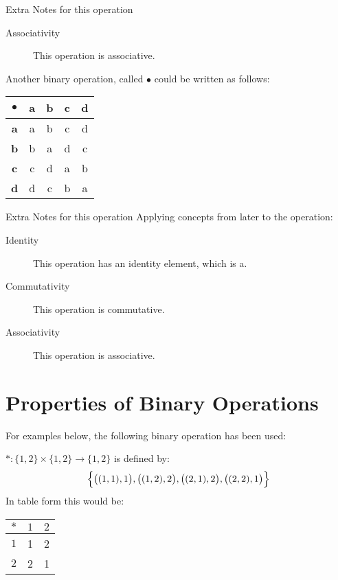 \documentclass[../notes.tex]{subfiles}
\begin{document}
\begin{examplebox}
\begin{center}
\begin{notebox}{Extra Notes for this operation}
\begin{description}
							\item[Associativity] This operation is associative.
						\end{description}
					\end{notebox}
					\end{center}
					Another binary operation, called $\bullet$ could be written as follows:
					\begin{center}
						\begin{tabular}{|c|c c c c|}
							\hline
							\textbf{$\bullet$} & \textbf{a} & \textbf{b} & \textbf{c} & \textbf{d}\\
							\hline
							\textbf{a} & a & b & c & d \\
							\textbf{b} & b & a & d & c \\
							\textbf{c} & c & d & a & b \\
							\textbf{d} & d & c & b & a \\
							\hline
						\end{tabular}
					\end{center}
					\begin{notebox}{Extra Notes for this operation}
						Applying concepts from later to the operation:
						\begin{description}
							\item[Identity] This operation has an identity element, which is a.
							\item[Commutativity] This operation is commutative.
							\item[Associativity] This operation is associative.
						\end{description}
					\end{notebox}
				\end{examplebox}
			\pagebreak
		\section{Properties of Binary Operations}
			For examples below, the following binary operation has been used:
			\begin{adjustwidth}{1cm}{}
				$*: \{1, 2\} \times \{1, 2\} \rightarrow \{1, 2\}$ is defined by:
				\begin{align*}
					\Bigl\{\bigl((1, 1), 1\bigr), \bigl((1, 2), 2\bigr), \bigl((2, 1), 2\bigr), \bigl((2, 2), 1\bigr)\Bigr\}
				\end{align*}
				In table form this would be:
				\begin{center}
					\begin{tabular}{|c|c c|}
						\hline
						\textbf{$*$} & \textbf{$1$} & \textbf{$2$}\\
						\hline
						\textbf{$1$} & 1 & 2 \\
						\textbf{$2$} & 2 & 1 \\
						\hline
					\end{tabular}
				\end{center}
			\end{adjustwidth}
\end{document}
